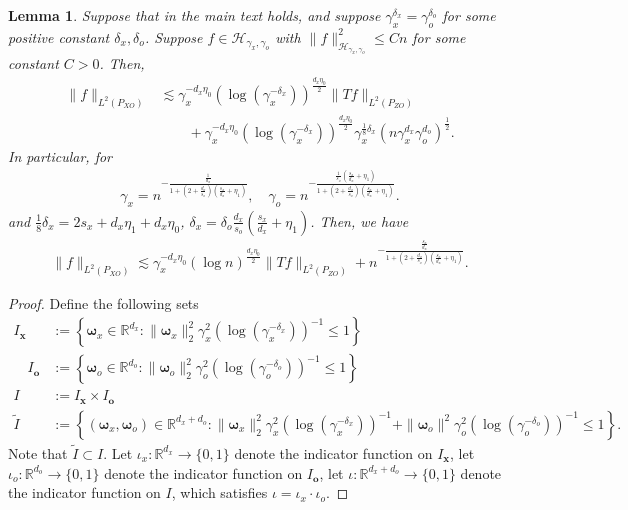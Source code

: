 \documentclass[11pt]{article}
\newcommand{\bx}{\mathbf x}
\newcommand{\bo}{\mathbf o}
\newcommand{\bomega}{\boldsymbol{\omega}}
\newcommand{\calH}{\mathcal{H}}
\newcommand{\R}{\mathbb{R}}
\newcommand{\0}{\mathbf{0}}
\newtheorem{lem}{Lemma}[section]
\begin{document}
\begin{appendix}
\begin{lem}\label{lem:l2toprojected_illp}
Suppose that  in the main text holds, and suppose $\gamma_x^{\delta_x} = \gamma_o^{\delta_o}$ for some positive constant $\delta_x, \delta_o$. 
Suppose $f\in \calH_{\gamma_x,\gamma_o}$ with $\|f\|_{\calH_{\gamma_x,\gamma_o}}^2 \leq Cn$ for some constant $C>0$. Then,
\begin{align}
    \|f\|_{L^2(P_{XO})} &\lesssim \gamma_x^{-d_x\eta_0} (\log (\gamma_x^{-\delta_x}))^{\frac{d_x\eta_0}{2}} \|Tf\|_{L^2(P_{ZO})} \nonumber \\
    &\qquad + \gamma_x^{-d_x\eta_0} (\log (\gamma_x^{-\delta_x}))^{\frac{d_x\eta_0}{2}}\gamma_x^{\frac{1}{8} \delta_x} (n \gamma_x^{d_x}\gamma_o^{d_o})^{\frac{1}{2}} \label{eq:term_lemma_D_18} .
\end{align}
In particular, for 
\begin{align*}
    \gamma_x = n^{-\frac{\frac{1}{d_x}}{1+(2+\frac{d_o}{s_o})(\frac{s_x}{d_x}+\eta_1)}},\quad \gamma_o = n^{-\frac{\frac{1}{s_o}(\frac{s_x}{d_x}+\eta_1)}{1+(2+\frac{d_o}{s_o})(\frac{s_x}{d_x}+\eta_1)}}. 
\end{align*}
and $\frac{1}{8} \delta_x = 2s_x + d_x\eta_1 + d_x \eta_0$, $\delta_x = \delta_o \frac{d_x}{s_o}(\frac{s_x}{d_x}+\eta_1)$. 
Then, we have
\begin{align*}
    \|f\|_{L^2(P_{XO})} \lesssim \gamma_x^{-d_x\eta_0} (\log n)^{\frac{d_x\eta_0}{2}} \|Tf\|_{L^2(P_{ZO})} + n^{-\frac{\frac{s_x}{d_x} }{1+(2 + \frac{d_o}{s_o})(\frac{s_x}{d_x}+\eta_1)}}.
\end{align*}
\end{lem}
\begin{proof}
Define the following sets 
\begin{align*}
    I_{\bx} &:= \left\{\bomega_{x}\in\R^{d_x}: \|\bomega_x\|_2^2 \gamma_x^{2} (\log (\gamma_x^{-\delta_x}))^{-1} \leq 1 \right\}\\ \quad I_{\bo} &:= \left\{\bomega_{o}\in\R^{d_o}: \|\bomega_{o}\|^2_{2}\gamma_o^{2} (\log (\gamma_o^{-\delta_o}))^{-1} \leq 1\right\}\\ I &:= I_{\bx} \times I_{\bo}\\
    \tilde{I} &:= \left\{(\bomega_x,\bomega_o)\in\R^{d_x+d_o}: \|\bomega_x\|_2^2 \gamma_x^{2} (\log (\gamma_x^{-\delta_x}))^{-1} + \|\bomega_{o}\|^2\gamma_o^{2} (\log (\gamma_o^{-\delta_o}))^{-1} \leq 1 \right\} .
\end{align*}
Note that $\tilde{I}\subset I$. Let $\iota_{x} : \R^{d_x}\to \{0,1\}$ denote the indicator function on $I_{\bx}$, let $\iota_{o} : \R^{d_o}\to \{0,1\}$ denote the indicator function on $I_{\bo}$, let $\iota:  \R^{d_x+d_o}\to \{0,1\}$ denote the indicator function on $I$, which satisfies $\iota = \iota_{x} \cdot \iota_{o}$. 

\end{proof}
\end{appendix}
\end{document}

